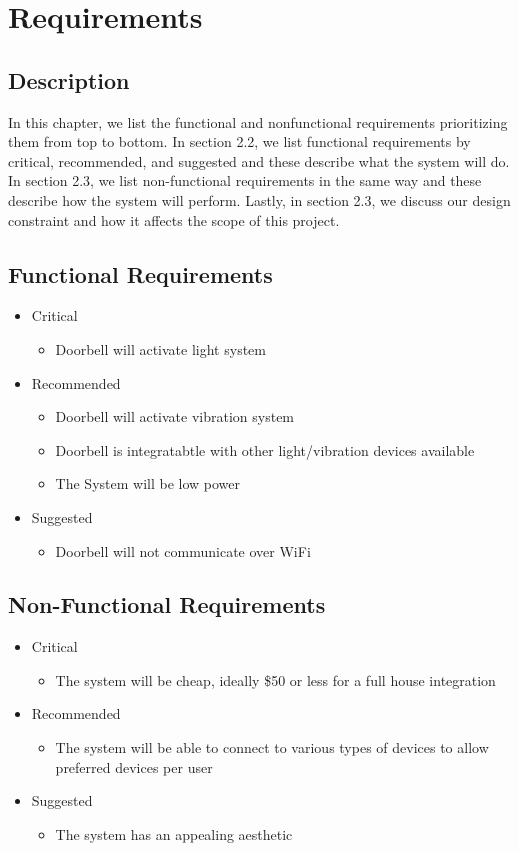 \chapter{Requirements}

\section{Description}
In this chapter, we list the functional and nonfunctional requirements prioritizing them from top to bottom. In section 2.2, we list functional requirements by critical, recommended, and suggested and these describe what the system will do. In section 2.3, we list non-functional requirements in the same way and these describe how the system will perform. Lastly, in section 2.3, we discuss our design constraint and how it affects the scope of this project.

\section{Functional Requirements}
\begin{itemize} 
\item Critical
	\begin{itemize} 
	\item Doorbell will activate light system
	\end{itemize}
\item Recommended
	\begin{itemize} 
	\item Doorbell will activate vibration system
	\item Doorbell is integratabtle with other light/vibration devices available
	\item The System will be low power
	\end{itemize}
\item Suggested
	\begin{itemize} 
	\item Doorbell will not communicate over WiFi
	\end{itemize}
\end{itemize}
\section{Non-Functional Requirements}
\begin{itemize} 
\item Critical
	\begin{itemize} 
	\item The system will be cheap, ideally \$50 or less for a full house integration
	\end{itemize}
\item Recommended
	\begin{itemize} 
	\item The system will be able to connect to various types of devices to allow preferred devices per user
	\end{itemize}
\item Suggested
	\begin{itemize} 
	\item The system has an appealing aesthetic
	\end{itemize}
\end{itemize}
